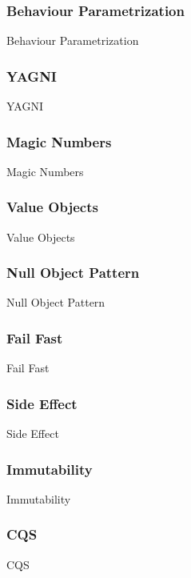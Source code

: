 \subsubsection{Behaviour Parametrization}
Behaviour Parametrization

\subsubsection{YAGNI}
YAGNI

\subsubsection{Magic Numbers}
Magic Numbers

\subsubsection{Value Objects}
Value Objects

\subsubsection{Null Object Pattern}
Null Object Pattern

\subsubsection{Fail Fast}
Fail Fast

\subsubsection{Side Effect}
Side Effect

\subsubsection{Immutability}
Immutability

\subsubsection{CQS}
CQS
